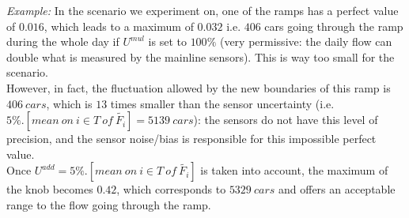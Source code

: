 \emph{Example:} In the scenario we experiment on, one of the ramps has a perfect value of $0.016$, which leads to a maximum of $0.032$ i.e. $406$ cars going through the ramp during the whole day if $U^{mul}$ is set to $100\%$ (very permissive: the daily flow can double what is measured by the mainline sensors). This is way too small for the scenario.\\ 
However, in fact, the fluctuation allowed by the new boundaries of this ramp is $406\ cars$, which is $13$ times smaller than the sensor uncertainty (i.e. $5 \% .[mean\ on\ i\in T\ of\ \widetilde{F_{i}}]=5139\ cars$): the sensors do not have this level of precision, and the sensor noise/bias is responsible for this impossible perfect value. \\
Once $U^{add}=5\%.[mean\ on\ i\in T\ of\ \widetilde{F_{i}}]$ is taken into account, the maximum of the knob becomes $0.42$, which corresponds to $5329\ cars$  and offers an acceptable range to the flow going through the ramp.\\